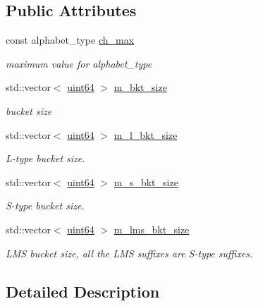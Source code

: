 \subsection*{Public Attributes}
\begin{DoxyCompactItemize}
\item 
const alphabet\+\_\+type \hyperlink{struct_validate4_1_1_bkt_info_a1485e4eceab1832f682e1751d310d2b9}{ch\+\_\+max}
\begin{DoxyCompactList}\small\item\em maximum value for alphabet\+\_\+type \end{DoxyCompactList}\item 
std\+::vector$<$ \hyperlink{types_8h_a60e8696a4678cd348e991a1f172e53f7}{uint64} $>$ \hyperlink{struct_validate4_1_1_bkt_info_a1659db6479f4667a77043e842b93f3fc}{m\+\_\+bkt\+\_\+size}
\begin{DoxyCompactList}\small\item\em bucket size \end{DoxyCompactList}\item 
std\+::vector$<$ \hyperlink{types_8h_a60e8696a4678cd348e991a1f172e53f7}{uint64} $>$ \hyperlink{struct_validate4_1_1_bkt_info_a0b44f8a1a308a6fff54cb0d05dd63ec4}{m\+\_\+l\+\_\+bkt\+\_\+size}
\begin{DoxyCompactList}\small\item\em L-\/type bucket size. \end{DoxyCompactList}\item 
std\+::vector$<$ \hyperlink{types_8h_a60e8696a4678cd348e991a1f172e53f7}{uint64} $>$ \hyperlink{struct_validate4_1_1_bkt_info_acf0b824764fc045b9f1ce0f1ed2863ad}{m\+\_\+s\+\_\+bkt\+\_\+size}
\begin{DoxyCompactList}\small\item\em S-\/type bucket size. \end{DoxyCompactList}\item 
std\+::vector$<$ \hyperlink{types_8h_a60e8696a4678cd348e991a1f172e53f7}{uint64} $>$ \hyperlink{struct_validate4_1_1_bkt_info_ad615aafce19e6e86948b227ad517b3cd}{m\+\_\+lms\+\_\+bkt\+\_\+size}
\begin{DoxyCompactList}\small\item\em L\+MS bucket size, all the L\+MS suffixes are S-\/type suffixes. \end{DoxyCompactList}\end{DoxyCompactItemize}


\subsection{Detailed Description}
